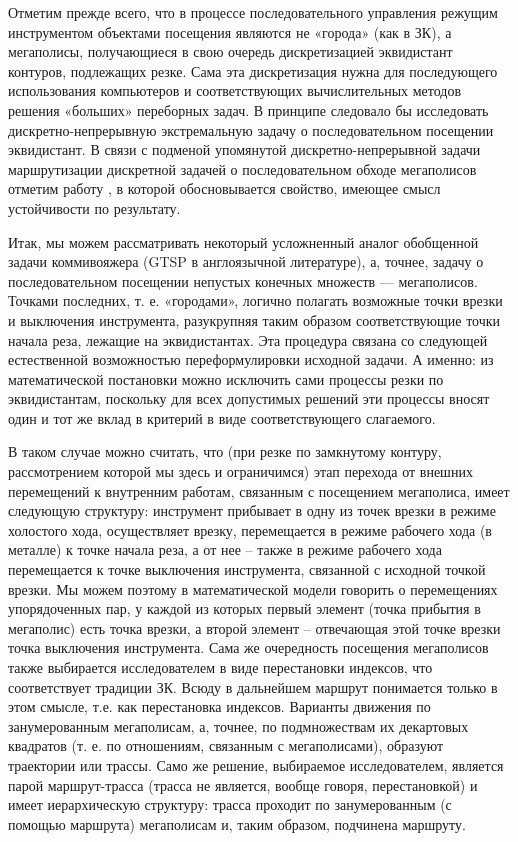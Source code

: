 \documentclass[12pt,twoside]{report}
\begin{document}
Отметим прежде всего, что в процессе последовательного управления режущим инструментом объектами посещения являются не «города» (как в ЗК), а мегаполисы, получающиеся в свою очередь дискретизацией эквидистант контуров, подлежащих резке. Сама эта дискретизация нужна для последующего использования компьютеров и соответствующих вычислительных методов решения «больших» переборных задач. В принципе следовало бы исследовать дискретно-непрерывную экстремальную задачу о последовательном посещении эквидистант. В связи с подменой упомянутой дискретно-непрерывной задачи маршрутизации дискретной задачей о последовательном обходе мегаполисов отметим работу \cite{intro01}, в которой обосновывается свойство, имеющее смысл устойчивости по результату.

Итак, мы можем рассматривать некоторый усложненный аналог обобщенной задачи коммивояжера (GTSP в англоязычной литературе), а, точнее, задачу о последовательном посещении непустых конечных множеств — мегаполисов. Точками последних, т. е. «городами», логично полагать возможные точки врезки и выключения инструмента, разукрупняя таким образом соответствующие точки начала реза, лежащие на эквидистантах. Эта процедура связана со следующей естественной возможностью переформулировки исходной задачи. А именно: из математической постановки можно исключить сами процессы резки по эквидистантам, поскольку для всех допустимых решений эти процессы вносят один и тот же вклад в критерий в виде соответствующего слагаемого.

В таком случае можно считать, что (при резке по замкнутому контуру, рассмотрением которой мы здесь и ограничимся) этап перехода от внешних перемещений к внутренним работам, связанным с посещением мегаполиса, имеет следующую структуру: инструмент прибывает в одну из точек врезки в режиме холостого хода, осуществляет врезку, перемещается в режиме рабочего хода (в металле) к точке начала реза, а от нее – также в режиме рабочего хода перемещается к точке выключения инструмента, связанной с исходной точкой врезки. Мы можем поэтому в математической модели говорить о перемещениях упорядоченных пар, у каждой из которых первый элемент (точка прибытия в мегаполис) есть точка врезки, а второй элемент – отвечающая этой точке врезки точка выключения инструмента. Сама же очередность посещения мегаполисов также выбирается исследователем в виде перестановки индексов, что соответствует традиции ЗК. Всюду в дальнейшем маршрут понимается только в этом смысле, т.е. как перестановка индексов. Варианты движения по занумерованным мегаполисам, а, точнее, по подмножествам их декартовых квадратов (т. е. по отношениям, связанным с мегаполисами), образуют траектории или трассы. Само же решение, выбираемое исследователем, является парой маршрут-трасса (трасса не является, вообще говоря, перестановкой) и имеет иерархическую структуру: трасса проходит по занумерованным (с помощью маршрута) мегаполисам и, таким образом, подчинена маршруту.
\end{document}
